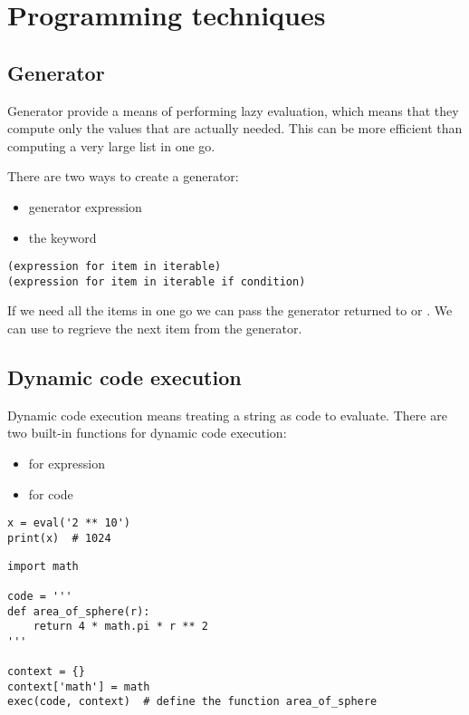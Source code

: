 
\chapter{Programming techniques}
\label{cha:progr-techn}


\section{Generator}
\label{cha:generator}

Generator provide a means of performing lazy evaluation, which means that they compute only the values that are actually needed.
This can be more efficient than computing a very large list in one go.


There are two ways to create a generator:
\begin{itemize}
\item generator expression
\item the keyword 
\end{itemize}


\begin{lstlisting}
(expression for item in iterable)
(expression for item in iterable if condition)
\end{lstlisting}

If we need all the items in one go we can pass the generator returned to  or .
We can use  to regrieve the next item from the generator.

\section{Dynamic code execution}
\label{sec:dynam-code-exec}
Dynamic code execution means treating a string as code to evaluate.
There are two built-in functions for dynamic code execution:
\begin{itemize}
\item {} for expression
\item {} for code
\end{itemize}

\begin{lstlisting}
x = eval('2 ** 10')
print(x)  # 1024
\end{lstlisting}


\begin{lstlisting}
import math

code = '''
def area_of_sphere(r):
    return 4 * math.pi * r ** 2
'''

context = {}
context['math'] = math
exec(code, context)  # define the function area_of_sphere

\end{lstlisting}



